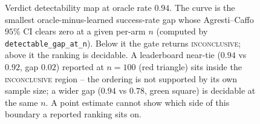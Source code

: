\begin{figure}[t]
  \caption{Verdict detectability map at oracle rate $0.94$. The curve is the smallest oracle-minus-learned success-rate gap whose Agresti--Caffo $95\%$ CI clears zero at a given per-arm $n$ (computed by \texttt{detectable\_gap\_at\_n}). Below it the gate returns \textsc{inconclusive}; above it the ranking is decidable. A leaderboard near-tie ($0.94$ vs $0.92$, gap $0.02$) reported at $n = 100$ (red triangle) sits inside the \textsc{inconclusive} region -- the ordering is not supported by its own sample size; a wider gap ($0.94$ vs $0.78$, green square) is decidable at the same $n$. A point estimate cannot show which side of this boundary a reported ranking sits on.}
  \label{fig:power_detectability}
\end{figure}
